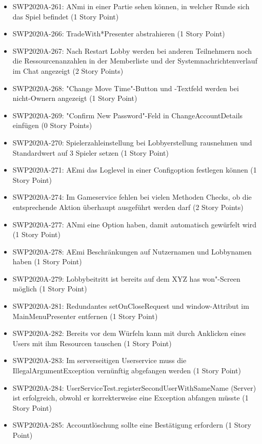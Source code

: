 \documentclass[12pt,a4paper, oneside]{article}
\begin{document}
\begin{itemize}
        \item SWP2020A-261:	ANmi in einer Partie sehen können, in welcher Runde sich das Spiel befindet (1 Story Point)
        \item SWP2020A-266:	TradeWith*Presenter abstrahieren (1 Story Point)
        \item SWP2020A-267:	Nach Restart Lobby werden bei anderen Teilnehmern noch die Ressourcenanzahlen in der Memberliste und der Systemnachrichtenverlauf im Chat angezeigt (2 Story Points)
        \item SWP2020A-268:	"Change Move Time"-Button und -Textfeld werden bei nicht-Ownern angezeigt (1 Story Point)
        \item SWP2020A-269:	"Confirm New Password"-Feld in ChangeAccountDetails einfügen (0 Story Points)
        \item SWP2020A-270:	Spielerzahleinstellung bei Lobbyerstellung rausnehmen und Standardwert auf 3 Spieler setzen (1 Story Point)
        \item SWP2020A-271:	AEmi das Loglevel in einer Configoption festlegen können (1 Story Point)
        \item SWP2020A-274:	Im Gameservice fehlen bei vielen Methoden Checks, ob die entsprechende Aktion überhaupt ausgeführt werden darf (2 Story Points)
        \item SWP2020A-277:	ANmi eine Option haben, damit automatisch gewürfelt wird (1 Story Point)
        \item SWP2020A-278:	AEmi Beschränkungen auf Nutzernamen und Lobbynamen haben (1 Story Point)
        \item SWP2020A-279:	Lobbybeitritt ist bereits auf dem XYZ has won"-Screen möglich (1 Story Point)
        \item SWP2020A-281:	Redundantes setOnCloseRequest und window-Attribut im MainMenuPresenter entfernen (1 Story Point)
        \item SWP2020A-282:	Bereits vor dem Würfeln kann mit durch Anklicken eines Users mit ihm Resourcen tauschen (1 Story Point)
        \item SWP2020A-283:	Im serverseitigen Userservice muss die IllegalArgumentException vernünftig abgefangen werden (1 Story Point)
        \item SWP2020A-284:	UserServiceTest.registerSecondUserWithSameName (Server) ist erfolgreich, obwohl er korrekterweise eine Exception abfangen müsste (1 Story Point)
        \item SWP2020A-285:	Accountlöschung sollte eine Bestätigung erfordern (1 Story Point)

\end{itemize}
\end{document}
